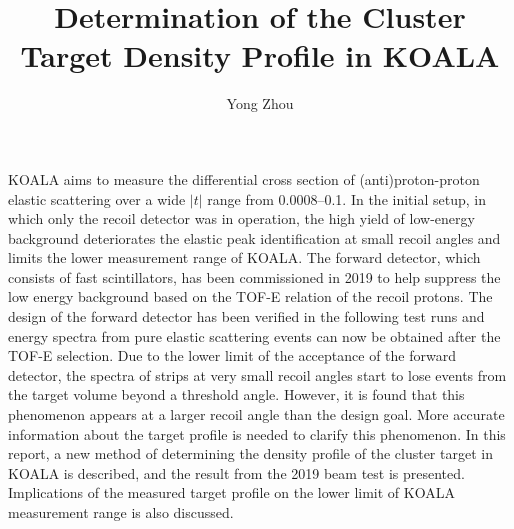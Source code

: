\documentclass[fleqn,twocolumn,a4paper]{ikpar}
\begin{document}
\parindent=0pt
\frenchspacing

\title{{\bf
    Determination of the Cluster Target Density Profile in KOALA
}}
\author{Yong Zhou
}

\maketitle

KOALA aims to measure the differential cross section of (anti)proton-proton elastic
scattering over a wide $|t|$ range from \SIrange{0.0008}{0.1}{\tmom}.
In the initial setup, in which only the recoil detector was in operation, the high yield of low-energy
background deteriorates the elastic peak identification at small recoil angles and limits the lower measurement range of KOALA.
The forward detector, which consists of fast scintillators, has been
commissioned in 2019 to help suppress the low energy background based on the TOF-E
relation of the recoil protons.
The design of the forward detector has been verified in the following test runs and energy spectra from pure elastic scattering events can now be obtained after the TOF-E selection.
Due to the lower limit of the acceptance of the forward detector, the spectra
of strips at very small recoil angles start to lose events from the
target volume beyond a threshold angle.
However, it is found that this phenomenon appears at a larger recoil angle than the design goal.
More accurate information about the target profile is needed to clarify this phenomenon.
In this report, a new method of determining the density profile of the cluster
target in KOALA is described, and the result from the 2019 beam test is presented.
Implications of the measured target profile on the lower limit of KOALA measurement range is also discussed.
\end{document}

